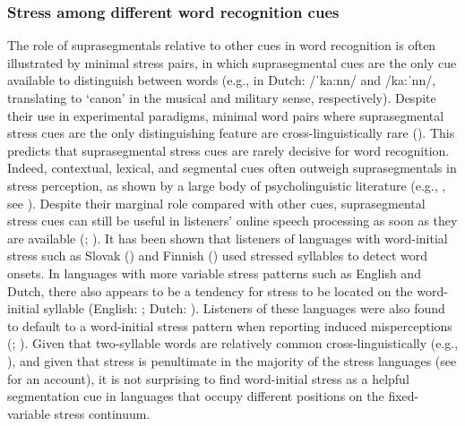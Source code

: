 \subsubsection{Stress among different word recognition cues}
The role of suprasegmentals relative to other cues in word recognition is often illustrated by minimal stress pairs, in which suprasegmental cues are the only cue available to distinguish between words (e.g., in Dutch: /ˈka:nn/ and /ka:ˈnn/, translating to `canon' in the musical and military sense, respectively). Despite their use in experimental paradigms, minimal word pairs where suprasegmental stress cues are the only distinguishing feature are cross-linguistically rare (\citealt{cutler_lexical_2005}). This predicts that suprasegmental stress cues are rarely decisive for word recognition. Indeed, contextual, lexical, and segmental cues often outweigh suprasegmentals in stress perception, as shown by a large body of psycholinguistic literature (e.g., \citealt{mattys_integration_2005}, see \citealt[144]{cutler_native_2012}). Despite their marginal role compared with other cues, suprasegmental stress cues can still be useful in listeners' online speech processing as soon as they are available (\citealt{reinisch_early_2010}; \citealt{sulpizio_italians_2012}). It has been shown that listeners of languages with word-initial stress such as Slovak (\citealt{hanulikova_possible_2010}) and Finnish (\citealt{suomi_vowel_1997}) used stressed syllables to detect word onsets. In languages with more variable stress patterns such as English and Dutch, there also appears to be a tendency for stress to be located on the word-initial syllable (English: \citealt{cutler_predominance_1987}; Dutch: \citealt{vanheuven_lexical_1988}). Listeners of these languages were also found to default to a word-initial stress pattern when reporting induced misperceptions (\citealt{cutler_rhythmic_1992}; \citealt{vroomen_cues_1996}). Given that two-syllable words are relatively common cross-linguistically (e.g., \citealt{vihman_phonological_2007}), and given that stress is penultimate in the majority of the stress languages (see \citealt{gordon_disentangling_2014} for an account), it is not surprising to find word-initial stress as a helpful segmentation cue in languages that occupy different positions on the fixed-variable stress continuum.

